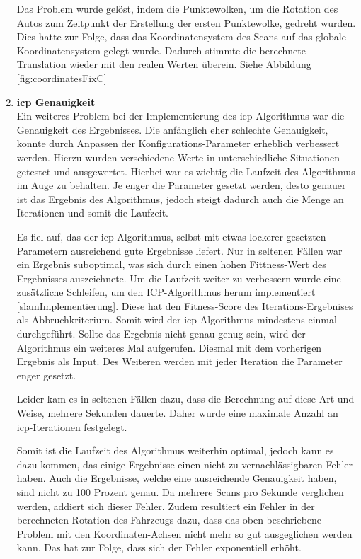 \begin{enumerate}[leftmargin=*]
    Das Problem wurde gelöst, indem die Punktewolken, um die Rotation des Autos zum Zeitpunkt der Erstellung der ersten Punktewolke, gedreht wurden.
    Dies hatte zur Folge, dass das Koordinatensystem des Scans auf das globale Koordinatensystem gelegt wurde.
    Dadurch stimmte die berechnete Translation wieder mit den realen Werten überein. 
    Siehe Abbildung \ref{fig:coordinatesFixC}

    \item \textbf{\ac{icp} Genauigkeit} \\
    Ein weiteres Problem bei der Implementierung des \ac{icp}-Algorithmus war die Genauigkeit des Ergebnisses.
    Die anfänglich eher schlechte Genauigkeit, konnte durch Anpassen der Konfigurations-Parameter erheblich verbessert werden.
    Hierzu wurden verschiedene Werte in unterschiedliche Situationen getestet und ausgewertet.
    Hierbei war es wichtig die Laufzeit des Algorithmus im Auge zu behalten.
    Je enger die Parameter gesetzt werden, desto genauer ist das Ergebnis des Algorithmus, jedoch steigt dadurch auch die Menge an Iterationen und somit die Laufzeit.

    Es fiel auf, das der \ac{icp}-Algorithmus, selbst mit etwas lockerer gesetzten Parametern ausreichend gute Ergebnisse liefert.
    Nur in seltenen Fällen war ein Ergebnis suboptimal, was sich durch einen hohen Fittness-Wert des Ergebnisses auszeichnete.
    Um die Laufzeit weiter zu verbessern wurde eine zusätzliche Schleifen, um den ICP-Algorithmus herum implementiert \ref{slamImplementierung}.
    Diese hat den Fitness-Score des Iterations-Ergebnises als Abbruchkriterium.
    Somit wird der \ac{icp}-Algorithmus mindestens einmal durchgeführt.
    Sollte das Ergebnis nicht genau genug sein, wird der Algorithmus ein weiteres Mal aufgerufen.
    Diesmal mit dem vorherigen Ergebnis als Input.
    Des Weiteren werden mit jeder Iteration die Parameter enger gesetzt.

    Leider kam es in seltenen Fällen dazu, dass die Berechnung auf diese Art und Weise, mehrere Sekunden dauerte.
    Daher wurde eine maximale Anzahl an \ac{icp}-Iterationen festgelegt.

    Somit ist die Laufzeit des Algorithmus weiterhin optimal, jedoch kann es dazu kommen, das einige Ergebnisse einen nicht zu vernachlässigbaren Fehler haben.
    Auch die Ergebnisse, welche eine ausreichende Genauigkeit haben, sind nicht zu 100 Prozent genau.
    Da mehrere Scans pro Sekunde verglichen werden, addiert sich dieser Fehler.
    Zudem resultiert ein Fehler in der berechneten Rotation des Fahrzeugs dazu, dass das oben beschriebene Problem mit den Koordinaten-Achsen nicht mehr so gut ausgeglichen werden kann.
    Das hat zur Folge, dass sich der Fehler exponentiell erhöht.


\end{enumerate}
